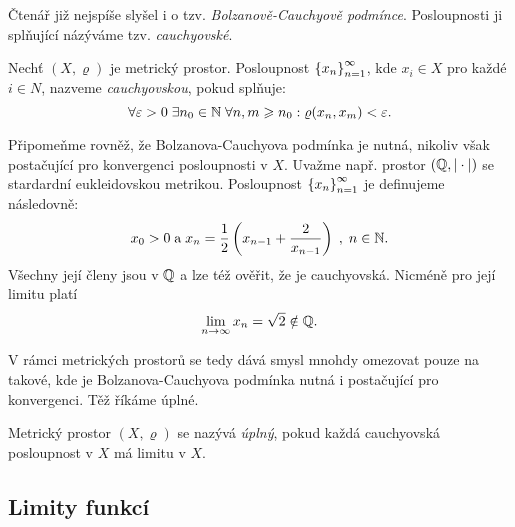 Čtenář již nejspíše slyšel i o tzv. \emph{Bolzanově-Cauchyově podmínce}. Posloupnosti ji splňující názýváme tzv. \emph{cauchyovské}.
\begin{definition}\label{def:cauchyovska-posloupnost}
    Nechť $(X,\varrho)$ je metrický prostor. Posloupnost $\left\{x_n\right\}_{n=1}^\infty$, kde $x_i\in X$ pro každé $i\in N$, nazveme \emph{cauchyovskou}, pokud splňuje:
    \[\forall\varepsilon>0\;\exists n_0\in\mathbb{N}\;\forall n,m\geqslant n_0:\varrho(x_n,x_m)<\varepsilon.\]
\end{definition}
Připomeňme rovněž, že Bolzanova-Cauchyova podmínka je nutná, nikoliv však postačující pro konvergenci posloupnosti v $X$. Uvažme např. prostor $(\mathbb{Q},|\cdot|)$ se stardardní eukleidovskou metrikou. Posloupnost $\left\{x_n\right\}_{n=1}^\infty$ je definujeme následovně:
\[x_0>0\;\text{a}\;x_n=\dfrac{1}{2}\left(x_{n-1}+\dfrac{2}{x_{n-1}}\right)\;,\;n\in\mathbb{N}.\]
Všechny její členy jsou v $\mathbb{Q}$ a lze též ověřit, že je cauchyovská. Nicméně pro její limitu platí
\[\lim_{n\to\infty}x_n=\sqrt{2}\notin\mathbb{Q}.\]

V rámci metrických prostorů se tedy dává smysl mnohdy omezovat pouze na takové, kde je Bolzanova-Cauchyova podmínka nutná i postačující pro konvergenci. Těž říkáme úplné.
\begin{definition}\label{def:uplny-mp}
    Metrický prostor $(X,\varrho)$ se nazývá \emph{úplný}, pokud každá cauchyovská posloupnost v $X$ má limitu v $X$.
\end{definition}

\subsection{Limity funkcí}\label{subsec:limity-fci}

